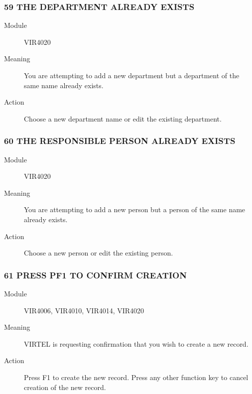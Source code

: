 \documentclass[letterpaper,10pt,english]{sphinxmanual}
\begin{document}
\subsubsection{59 THE DEPARTMENT ALREADY EXISTS}
\label{\detokenize{messages:the-department-already-exists}}\begin{description}
\item[{Module}] \leavevmode
VIR4020

\item[{Meaning}] \leavevmode
You are attempting to add a new department but a department of the same name already exists.

\item[{Action}] \leavevmode
Choose a new department name or edit the existing department.

\end{description}


\subsubsection{60 THE RESPONSIBLE PERSON ALREADY EXISTS}
\label{\detokenize{messages:the-responsible-person-already-exists}}\begin{description}
\item[{Module}] \leavevmode
VIR4020

\item[{Meaning}] \leavevmode
You are attempting to add a new person but a person of the same name already exists.

\item[{Action}] \leavevmode
Choose a new person or edit the existing person.

\end{description}


\subsubsection{61 PRESS PF1 TO CONFIRM CREATION}
\label{\detokenize{messages:press-pf1-to-confirm-creation}}\begin{description}
\item[{Module}] \leavevmode
VIR4006, VIR4010, VIR4014, VIR4020

\item[{Meaning}] \leavevmode
VIRTEL is requesting confirmation that you wish to create a new record.

\item[{Action}] \leavevmode
Press F1 to create the new record. Press any other function key to cancel creation of the new record.

\end{description}
\end{document}
